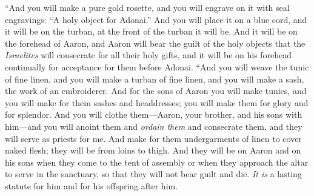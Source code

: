 \begin{biblechapter}
\verse “And you will make a pure gold rosette, and you will engrave on it with seal engravings: “A holy object for Adonai.”
\verse And you will place it on a blue cord, and it will be on the turban, at the front of the turban it will be.
\verse And it will be on the forehead of Aaron, and Aaron will bear the guilt of the holy objects that the \textit{Israelites} will consecrate for all their holy gifts, and it will be on his forehead continually for acceptance for them before Adonai.
\verse “And you will weave the tunic of fine linen, and you will make a turban of fine linen, and you will make a sash, the work of an embroiderer.
\verse And for the sons of Aaron you will make tunics, and you will make for them sashes and headdresses; you will make them for glory and for splendor.
\verse And you will clothe them—Aaron, your brother, and his sons with him—and you will anoint them and \textit{ordain them} and consecrate them, and they will serve as priests for me.
\verse And make for them undergarments of linen to cover naked flesh; they will be from loins to thigh.
\verse And they will be on Aaron and on his sons when they come to the tent of assembly or when they approach the altar to serve in the sanctuary, so that they will not bear guilt and die. \textit{It is} a lasting statute for him and for his offspring after him.
\end{biblechapter}

